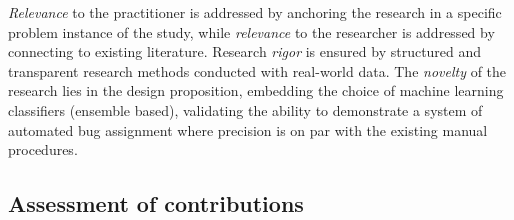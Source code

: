 \documentclass[graybox]{svmult}
\newcommand{\per}[1]{\textcolor{cyan}{{\it [Per says: #1]}}}
\newcommand{\per}[1]{}
\begin{document}
\emph{Relevance} to the practitioner is addressed by anchoring the research in a specific problem instance of the study, while \emph{relevance} to the researcher is addressed by connecting to existing literature. Research \emph{rigor} is ensured by structured and transparent research methods conducted with real-world data. The \emph{novelty} of the research lies in the design proposition, embedding the choice of machine learning classifiers (ensemble based), validating the ability to demonstrate a system of automated bug assignment where precision is on par with the existing manual procedures.

%
%



\subsection{Assessment of contributions}
\label{sec:assessment}
\end{document}
